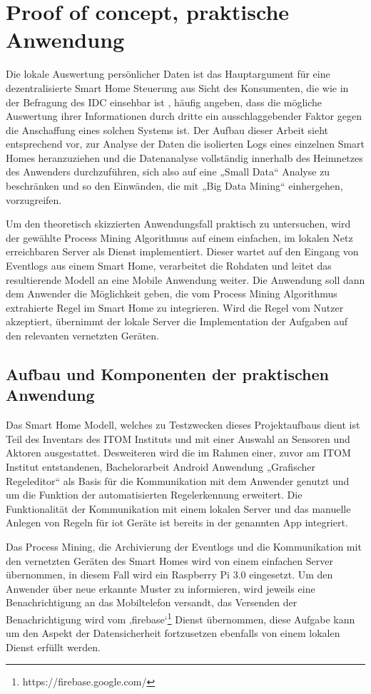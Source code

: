 \chapter{Proof of concept, praktische Anwendung}\label{chap:experiments}
Die lokale Auswertung persönlicher Daten ist das Hauptargument für eine dezentralisierte Smart Home Steuerung aus Sicht des Konsumenten, die wie in der Befragung des IDC einsehbar ist \cite{IDC}, häufig angeben, dass die mögliche Auswertung ihrer Informationen durch dritte ein ausschlaggebender Faktor gegen die Anschaffung eines solchen Systems ist. Der Aufbau dieser Arbeit sieht entsprechend vor, zur Analyse der Daten die isolierten Logs eines einzelnen Smart Homes heranzuziehen und die Datenanalyse vollständig innerhalb des Heimnetzes des Anwenders durchzuführen, sich also auf eine „Small Data“ Analyse zu beschränken und so den Einwänden, die mit „Big Data Mining“ einhergehen, vorzugreifen. 

Um den theoretisch skizzierten Anwendungsfall praktisch zu untersuchen, wird der gewählte Process Mining Algorithmus auf einem einfachen, im lokalen Netz erreichbaren Server als Dienst implementiert. Dieser wartet auf den Eingang von Eventlogs aus einem Smart Home, verarbeitet die Rohdaten und leitet das resultierende Modell an eine Mobile Anwendung weiter. Die Anwendung soll dann dem Anwender die Möglichkeit geben, die vom Process Mining Algorithmus extrahierte Regel im Smart Home zu integrieren. Wird die Regel vom Nutzer akzeptiert, übernimmt der lokale Server die Implementation der Aufgaben auf den relevanten vernetzten Geräten.

\section{Aufbau und Komponenten der praktischen Anwendung}
Das Smart Home Modell, welches zu Testzwecken dieses Projektaufbaus dient ist Teil des Inventars des ITOM Instituts und mit einer Auswahl an Sensoren und Aktoren ausgestattet. 
Desweiteren wird die im Rahmen einer, zuvor am ITOM Institut entstandenen, Bachelorarbeit Android Anwendung „Grafischer Regeleditor“ als Basis für die Kommunikation mit dem Anwender genutzt und um die Funktion der automatisierten Regelerkennung erweitert. Die Funktionalität der Kommunikation mit einem lokalen Server und das manuelle Anlegen von Regeln für iot Geräte ist bereits in der genannten App integriert.

Das Process Mining, die Archivierung der Eventlogs und die Kommunikation mit den vernetzten Geräten des Smart Homes wird von einem einfachen Server übernommen, in diesem Fall wird ein Raspberry Pi 3.0 eingesetzt. Um den Anwender über neue erkannte Muster zu informieren, wird jeweils eine Benachrichtigung an das Mobiltelefon versandt, das Versenden der Benachrichtigung wird vom ‚firebase‘\footnote{https://firebase.google.com/} Dienst übernommen, diese Aufgabe kann um den Aspekt der Datensicherheit fortzusetzen ebenfalls von einem lokalen Dienst erfüllt werden.

